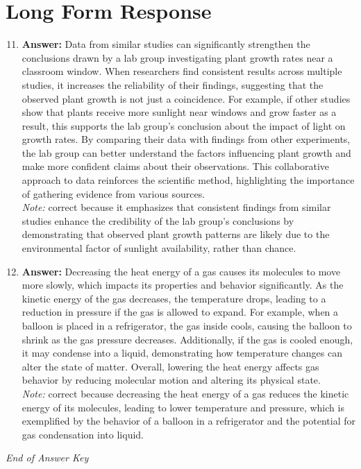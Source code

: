 \documentclass[12pt]{article}
\begin{document}
\section*{Long Form Response}
\begin{enumerate}[label=\arabic*.]
\setcounter{enumi}{10}
\item \textbf{Answer:} Data from similar studies can significantly strengthen the conclusions drawn by a lab group investigating plant growth rates near a classroom window. When researchers find consistent results across multiple studies, it increases the reliability of their findings, suggesting that the observed plant growth is not just a coincidence. For example, if other studies show that plants receive more sunlight near windows and grow faster as a result, this supports the lab group's conclusion about the impact of light on growth rates. By comparing their data with findings from other experiments, the lab group can better understand the factors influencing plant growth and make more confident claims about their observations. This collaborative approach to data reinforces the scientific method, highlighting the importance of gathering evidence from various sources.
\\ \textit{Note:} correct because it emphasizes that consistent findings from similar studies enhance the credibility of the lab group's conclusions by demonstrating that observed plant growth patterns are likely due to the environmental factor of sunlight availability, rather than chance.
\item \textbf{Answer:} Decreasing the heat energy of a gas causes its molecules to move more slowly, which impacts its properties and behavior significantly. As the kinetic energy of the gas decreases, the temperature drops, leading to a reduction in pressure if the gas is allowed to expand. For example, when a balloon is placed in a refrigerator, the gas inside cools, causing the balloon to shrink as the gas pressure decreases. Additionally, if the gas is cooled enough, it may condense into a liquid, demonstrating how temperature changes can alter the state of matter. Overall, lowering the heat energy affects gas behavior by reducing molecular motion and altering its physical state.
\\ \textit{Note:} correct because decreasing the heat energy of a gas reduces the kinetic energy of its molecules, leading to lower temperature and pressure, which is exemplified by the behavior of a balloon in a refrigerator and the potential for gas condensation into liquid.
\end{enumerate}

\vfill
\noindent\textit{End of Answer Key}
\end{document}
